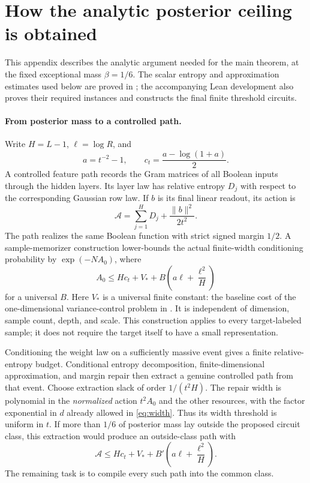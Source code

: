 \documentclass[11pt]{article}
\theoremstyle{remark}\newtheorem{remark}[theorem]{Remark}
\begin{document}
\appendix
\section{How the analytic posterior ceiling is obtained}
\label{app:analytic-mechanism}

This appendix describes the analytic argument needed for the main theorem,
at the fixed exceptional mass $\beta=1/6$. The scalar entropy and
approximation estimates used below are proved in \cite{barriers}; the
accompanying Lean development also proves their required instances and
constructs the final finite threshold circuits.

\paragraph{From posterior mass to a controlled path.}
Write $H=L-1$, $\ell=\log R$, and
\[
 a=t^{-2}-1,\qquad c_t=\frac{a-\log(1+a)}2.
\]
A controlled feature path records the Gram matrices of all Boolean inputs
through the hidden layers. Its layer law has relative entropy $D_j$ with
respect to the corresponding Gaussian row law. If $b$ is its final linear
readout, its action is
\[
 \mathcal A=\sum_{j=1}^{H}D_j+\frac{\|b\|^2}{2t^2}.
\]
The path realizes the same Boolean function with strict signed margin
$1/2$. A sample-memorizer construction lower-bounds the actual finite-width
conditioning probability by $\exp(-NA_0)$, where
\[
 A_0\le Hc_t+V_*+B\left(a\ell+\frac{\ell^2}{H}\right)
\]
for a universal $B$. Here $V_*$ is a universal finite constant: the
baseline cost of the one-dimensional variance-control problem in
\cite{barriers}. It is independent of dimension, sample count, depth,
and scale. This construction applies to every target-labeled sample;
it does not require the target itself to have a small representation.

Conditioning the weight law on a sufficiently massive event gives a
finite relative-entropy budget. Conditional entropy decomposition,
finite-dimensional approximation, and margin repair then extract a
genuine controlled path from that event. Choose extraction slack of order
$1/(t^2H)$. The repair width is polynomial in the \emph{normalized} action
$t^2A_0$ and the other resources, with the factor exponential in $d$ already
allowed in \eqref{eq:width}. Thus its width threshold is uniform in $t$.
If more than $1/6$ of posterior mass lay outside the proposed circuit
class, this extraction would produce an outside-class path with
\[
 \mathcal A\le Hc_t+V_*+
 B'\left(a\ell+\frac{\ell^2}{H}\right).
 \tag{A.1}\label{eq:appendix-action}
\]
The remaining task is to compile every such path into the common class.
\end{document}

